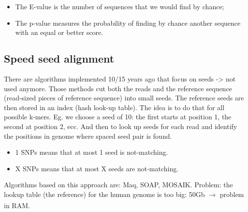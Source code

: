 \begin{itemize}
    \item The E-value is the number of sequences that we would find by chance;
    \item The p-value measures the probability of finding by chance another sequence with an equal or better score.
\end{itemize}


\subsection{Speed seed alignment}

There are algorithms implemented 10/15 years ago that focus on seeds -> not used anymore. 
Those methods cut both the reads and the reference sequence (read-sized pieces of reference sequence) into small seeds. The reference seeds are then stored in an index (hash look-up table).
The idea is to do that for all possible k-mers. Eg. we choose a seed of 10: the first starts at position 1, the second at position 2, ecc. And then to look up seeds for each read and identify the positions in genome where spaced seed pair is found. 

\begin{itemize}
    \item 1 SNPs means that at most 1 seed is not-matching.
    \item X SNPs means that at most X seeds are not-matching.
\end{itemize}

Algorithms based on this approach are: Maq, SOAP, MOSAIK. 
Problem: the lookup table (the reference) for the human genome is too big: 50Gb $\xrightarrow[]{}$ problem in RAM.

